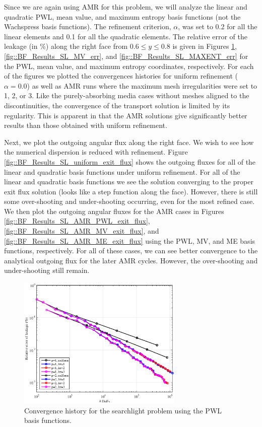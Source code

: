 Since we are again using AMR for this problem, we will analyze the linear and quadratic PWL, mean value, and maximum entropy basis functions (not the Wachspress basis functions). The refinement criterion, $\alpha$, was set to 0.2 for all the linear elements and 0.1 for all the quadratic elements. The relative error of the leakage (in \%) along the right face from $0.6 \leq y \leq 0.8$ is given in Figures \ref{fig::BF_Results_SL_PWL_err}, \ref{fig::BF_Results_SL_MV_err}, and \ref{fig::BF_Results_SL_MAXENT_err} for the PWL, mean value, and maximum entropy coordinates, respectively. For each of the figures we plotted the convergences histories for uniform refinement ($\alpha = 0.0$) as well as AMR runs where the maximum mesh irregularities were set to 1, 2, or 3. Like the purely-absorbing media cases without meshes aligned to the discontinuities, the convergence of the transport solution is limited by its regularity. This is apparent in that the AMR solutions give significantly better results than those obtained with uniform refinement. 

Next, we plot the outgoing angular flux along the right face. We wish to see how the numerical dispersion is reduced with refinement. Figure \ref{fig::BF_Results_SL_uniform_exit_flux} shows the outgoing fluxes for all of the linear and quadratic basis functions under uniform refinement. For all of the linear and quadratic basis functions we see the solution converging to the proper exit flux solution (looks like a step function along the face). However, there is still some over-shooting and under-shooting occurring, even for the most refined case. We then plot the outgoing angular fluxes for the AMR cases in Figures \ref{fig::BF_Results_SL_AMR_PWL_exit_flux}, \ref{fig::BF_Results_SL_AMR_MV_exit_flux}, and \ref{fig::BF_Results_SL_AMR_ME_exit_flux} using the PWL, MV, and ME basis functions, respectively. For all of these cases, we can see better convergence to the analytical outgoing flux for the later AMR cycles. However, the over-shooting and under-shooting still remain.

\begin{figure}
\centering
\includegraphics[width=0.70\textwidth]{figures/sec_BF/SL_PWL_Err.eps}
\caption{Convergence history for the searchlight problem using the PWL basis functions.}
\label{fig::BF_Results_SL_PWL_err}
\end{figure}

